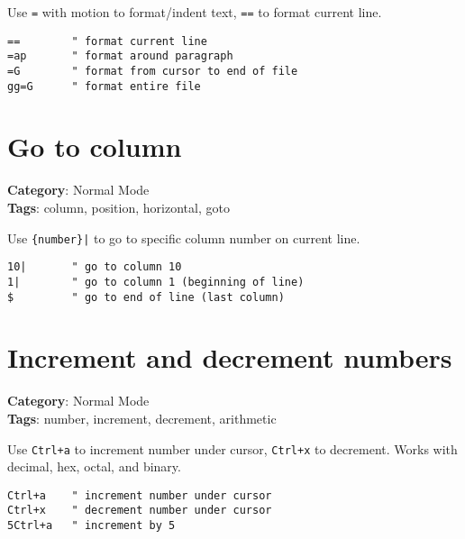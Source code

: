 {{{{{{{{{Use {\footnotesize \Verb§=§} with motion to format/indent text, {\footnotesize \Verb§==§} to format current line.

\begin{Exa*}{}
\begin{Verbatim}[fontsize=\footnotesize, breaklines, breakanywhere]
==        " format current line
=ap       " format around paragraph
=G        " format from cursor to end of file
gg=G      " format entire file
\end{Verbatim}
\end{Exa*}

\section{Go to column}

\textbf{Category}: Normal Mode\\ \textbf{Tags}: column, position, horizontal, goto
\vspace{0.5cm}

Use {\footnotesize \Verb§{number}|§} to go to specific column number on current line.

\begin{Exa*}{}
\begin{Verbatim}[fontsize=\footnotesize, breaklines, breakanywhere]
10|       " go to column 10
1|        " go to column 1 (beginning of line)
$         " go to end of line (last column)
\end{Verbatim}
\end{Exa*}

\section{Increment and decrement numbers}

\textbf{Category}: Normal Mode\\ \textbf{Tags}: number, increment, decrement, arithmetic
\vspace{0.5cm}

Use {\footnotesize \Verb§Ctrl+a§} to increment number under cursor, {\footnotesize \Verb§Ctrl+x§} to decrement. Works with decimal, hex, octal, and binary.

\begin{Exa*}{}
\begin{Verbatim}[fontsize=\footnotesize, breaklines, breakanywhere]
Ctrl+a    " increment number under cursor
Ctrl+x    " decrement number under cursor
5Ctrl+a   " increment by 5
\end{Verbatim}
\end{Exa*}

}}}}}}}}}
